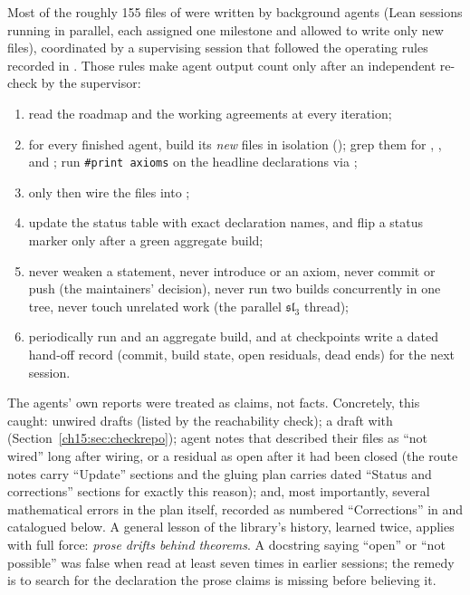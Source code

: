 Most of the roughly 155 files of  were written by background agents (Lean
sessions running in parallel, each assigned one milestone and allowed to write only new files),
coordinated by a supervising session that followed the operating rules recorded in
. Those rules make agent output count only after an independent
re-check by the supervisor:
\begin{enumerate}
\item read the roadmap and the working agreements at every iteration;
\item for every finished agent, build its \emph{new} files in isolation
  (); grep them for , ,
   and ; run \texttt{\#print axioms} on the headline declarations
  via ;
\item only then wire the files into ;
\item update the status table with exact declaration names, and flip a status marker only after a
  green aggregate build;
\item never weaken a statement, never introduce  or an axiom, never commit or push (the
  maintainers' decision), never run two builds concurrently in one tree, never touch unrelated work
  (the parallel $\mathfrak{sl}_3$ thread);
\item periodically run  and an aggregate build, and at
  checkpoints write a dated hand-off record (commit, build state, open residuals, dead ends) for the next session.
\end{enumerate}
The agents' own reports were treated as claims, not facts. Concretely, this caught: unwired drafts
(listed by the reachability check); a draft with  (Section~\ref{ch15:sec:checkrepo});
agent notes that described their files as ``not wired'' long after wiring, or a residual as open
after it had been closed (the route notes carry ``Update'' sections and the gluing plan carries
dated ``Status and corrections'' sections for exactly this reason); and, most importantly, several
mathematical errors in the plan itself, recorded as numbered ``Corrections'' in
 and catalogued below. A general lesson of the library's history,
learned twice, applies with full force: \emph{prose drifts behind theorems}. A
docstring saying ``open'' or ``not possible'' was false when read at least seven times in earlier
sessions; the remedy is to search for the declaration the prose claims is missing before believing
it.

